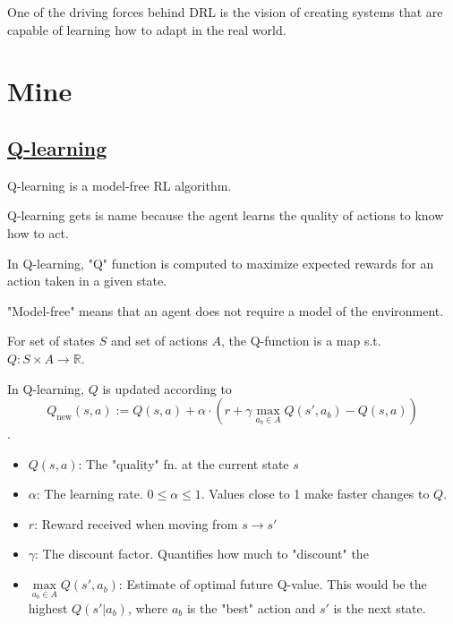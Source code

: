 One of the
driving forces behind DRL is the vision of creating systems
that are capable of learning how to adapt in the real world.




\section{Mine}


\subsection*{\href{https://en.wikipedia.org/wiki/-learning}{Q-learning}}
\begin{quest}
	\item \cloze Q-learning is a model-free RL algorithm.
	
	\cloze Q-learning gets is name because the agent learns the quality of actions to know how to act. 

	\cloze In Q-learning, "Q" function is computed to maximize expected rewards for an action taken in a given state.  
	
	\cloze "Model-free" means that an agent does not require a model of the environment.
	
	\cloze For set of states $S$ and set of actions $A$, the Q-function is a map s.t. $Q:S\times A\to \mathbb{R}$.
	
	\item In Q-learning, $Q$ is updated according to 
	\[ Q_{\text{new}}(s, a) := Q(s, a) 
		+ \alpha \cdot 
			\left( r + \gamma \max\limits_{a_b\in A} Q(s', a_b) 
			- Q(s, a) \right) \].
	\begin{itemize}
		\item $Q(s, a)$: The "quality" fn. at the current state $s$
		\item $\alpha$: The learning rate. $0 \leq \alpha \leq 1$. Values close to 1 make faster changes to $Q$.  
		\item $r$: Reward received when moving from $s \to s'$
		\item $\gamma$: The discount factor. Quantifies how much to "discount" the 
		\item $\max\limits_{a_b\in A} Q(s', a_b)$: Estimate of optimal future Q-value. This would be the highest $Q(s'|a_b)$, where $a_b$ is the "best" action and $s'$ is the next state.  
	\end{itemize}
\end{quest} 



